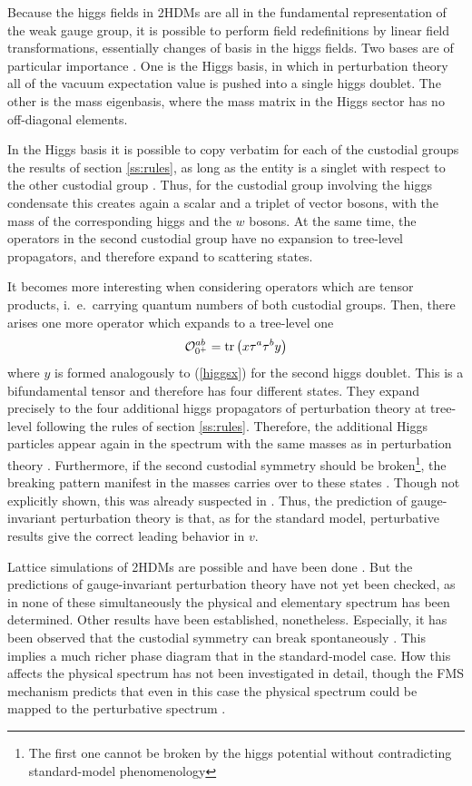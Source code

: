 \documentclass[final,12pt]{article}
\newcommand*{\no}{\noindent}
\newcommand*{\be}{\begin{equation}}
\newcommand*{\ee}{\end{equation}}
\newcommand*{\pref}[1]{(\ref{#1})}
\newcommand*{\tr}{\mathrm{tr}}
\newcommand*{\1}{1\!\!\!\bot}
\newcommand*{\op}{{\cal O}}
\begin{document}
Because the higgs fields in 2HDMs are all in the fundamental representation of the weak gauge group, it is possible to perform field redefinitions by linear field transformations, essentially changes of basis in the higgs fields. Two bases are of particular importance \cite{Branco:2011iw,Ivanov:2017dad}. One is the Higgs basis, in which in perturbation theory all of the vacuum expectation value is pushed into a single higgs doublet. The other is the mass eigenbasis, where the mass matrix in the Higgs sector has no off-diagonal elements.

In the Higgs basis it is possible to copy verbatim for each of the custodial groups the results of section \ref{ss:rules}, as long as the entity is a singlet with respect to the other custodial group \cite{Maas:2016qpu}. Thus, for the custodial group involving the higgs condensate this creates again a scalar and a triplet of vector bosons, with the mass of the corresponding higgs and the $w$ bosons. At the same time, the operators in the second custodial group have no expansion to tree-level propagators, and therefore expand to scattering states.

It becomes more interesting when considering operators which are tensor products, i.\ e.\ carrying quantum numbers of both custodial groups. Then, there arises one more operator which expands to a tree-level one \cite{Maas:2016qpu}
\be
\op_{0^+}^{ab}=\tr\left(x\tau^a\tau^by\right)\label{hdmtensor}
\ee
\no where $y$ is formed analogously to \pref{higgsx} for the second higgs doublet. This is a bifundamental tensor and therefore has four different states. They expand precisely to the four additional higgs propagators of perturbation theory at tree-level following the rules of section \ref{ss:rules}. Therefore, the additional Higgs particles appear again in the spectrum with the same masses \cite{Maas:2016qpu} as in perturbation theory \cite{Branco:2011iw,Ivanov:2017dad}. Furthermore, if the second custodial symmetry should be broken\footnote{The first one cannot be broken by the higgs potential without contradicting standard-model phenomenology}, the breaking pattern manifest in the masses carries over to these states \cite{Maas:2016qpu}. Though not explicitly shown, this was already suspected in \cite{Frohlich:1981yi}. Thus, the prediction of gauge-invariant perturbation theory is that, as for the standard model, perturbative results give the correct leading behavior in $v$.

Lattice simulations of 2HDMs are possible and have been done \cite{Wurtz:2009gf,Lewis:2010ps,Maas:2014nya}. But the predictions of gauge-invariant perturbation theory have not yet been checked, as in none of these simultaneously the physical and elementary spectrum has been determined. Other results have been established, nonetheless. Especially, it has been observed that the custodial symmetry can break spontaneously \cite{Wurtz:2009gf,Lewis:2010ps}. This implies a much richer phase diagram that in the standard-model case. How this affects the physical spectrum has not been investigated in detail, though the FMS mechanism predicts that even in this case the physical spectrum could be mapped to the perturbative spectrum \cite{Maas:2016qpu}.
\end{document}
